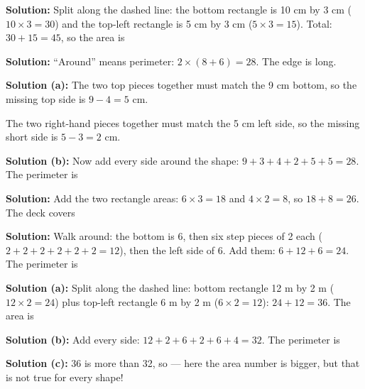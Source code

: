 \documentclass[12pt]{article}
\begin{document}
\textbf{Solution:} Split along the dashed line: the bottom rectangle is
10 cm by 3 cm ($10 \times 3 = 30$) and the top-left rectangle is 5 cm by 3 cm
($5 \times 3 = 15$). Total: $30 + 15 = 45$, so the area is


\textbf{Solution:} ``Around'' means perimeter: $2 \times (8 + 6) = 28$.
The edge is  long.


\textbf{Solution (a):} The two top pieces together must match the 9 cm bottom,
so the missing top side is $9 - 4 = 5$ cm.  \par
The two right-hand pieces together must match the 5 cm left side, so the
missing short side is $5 - 3 = 2$ cm. 

\textbf{Solution (b):} Now add every side around the shape:
$9 + 3 + 4 + 2 + 5 + 5 = 28$. The perimeter is 


\textbf{Solution:} Add the two rectangle areas: $6 \times 3 = 18$ and
$4 \times 2 = 8$, so $18 + 8 = 26$. The deck covers 


\textbf{Solution:} Walk around: the bottom is 6, then six step pieces of 2
each ($2+2+2+2+2+2 = 12$), then the left side of 6. Add them:
$6 + 12 + 6 = 24$. The perimeter is 


\textbf{Solution (a):} Split along the dashed line: bottom rectangle
12 m by 2 m ($12 \times 2 = 24$) plus top-left rectangle 6 m by 2 m
($6 \times 2 = 12$): $24 + 12 = 36$. The area is 

\textbf{Solution (b):} Add every side: $12 + 2 + 6 + 2 + 6 + 4 = 32$.
The perimeter is 

\textbf{Solution (c):} 36 is more than 32, so  --- here the area
number is bigger, but that is not true for every shape!
\end{document}
